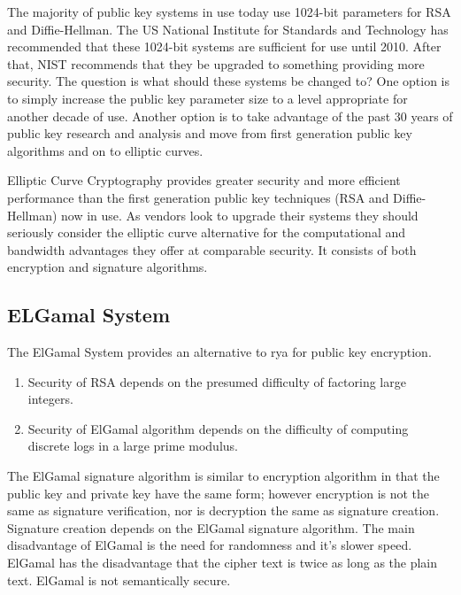 \documentclass[conference]{IEEEtran}
\begin{document}
The majority of public key systems in use today use 1024-bit parameters for RSA and Diffie-Hellman. The US National Institute for Standards and Technology has recommended that these 1024-bit systems are sufficient for use until 2010. After that, NIST recommends that they be upgraded to something providing more security. The question is what should these systems be changed to? One option is to simply increase the public key parameter size to a level appropriate for another decade of use. Another option is to take advantage of the past 30 years of public key research and analysis and move from first generation public key algorithms and on to elliptic curves.

Elliptic Curve Cryptography provides greater security and more efficient performance than the first generation public key techniques (RSA and Diffie-Hellman) now in use. As vendors look to upgrade their systems they should seriously consider the elliptic curve alternative for the computational and bandwidth advantages they offer at comparable security. It consists of both encryption and signature algorithms. 

\subsection{{\large ELGamal System}}
The ElGamal System \cite{elgamal} provides an alternative to rya for public key encryption.
\begin{enumerate}
	\item Security of RSA depends on the presumed difficulty of factoring large integers.
	\item Security of ElGamal algorithm depends on the difficulty of computing discrete logs in a large prime modulus.
\end{enumerate}
The ElGamal signature algorithm is similar to encryption algorithm in that the public key and private key have the same form; however encryption is not the same as signature verification, nor is decryption the same as signature creation. Signature creation depends on the ElGamal signature algorithm. The main disadvantage of ElGamal is the need for randomness and it's slower speed.  ElGamal has the disadvantage that the cipher text is twice as long as the plain text. ElGamal is not semantically secure.
\end{document}
